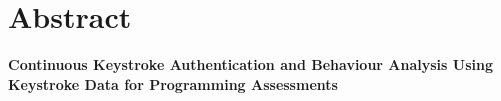 \chapter*{Abstract}
\thispagestyle{plain}

{\fontsize{12}{15}\bfseries\selectfont
  Continuous Keystroke Authentication and Behaviour Analysis Using Keystroke Data for Programming Assessments\par}

\vspace{10pt}


